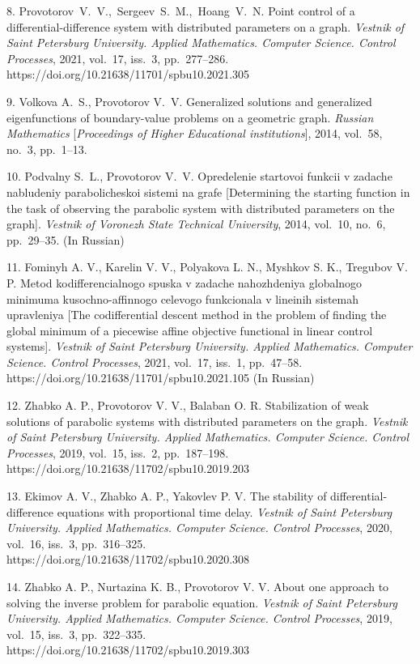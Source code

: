 {8. Provotorov~V.~V.,~Sergeev~S.~M.,~Hoang~V.~N. Point control of a differential-difference system with distributed parameters on a graph. \textit{Vestnik of Saint Petersburg University. Applied Mathematics. Computer Science. Control Processes}, 2021, vol.~17, iss.~3, pp.~277--286. \\
https://doi.org/10.21638/11701/spbu10.2021.305

9. Volkova A.~S., Provotorov V.~V. Generalized solutions and generalized eigenfunctions
of boun\-dary-value problems on a geometric graph. \textit{Russian Mathematics} [\textit{Proceedings of Higher Educational in\-sti\-tu\-tions}], 2014, vol.~58, no.~3, pp.~1--13.

10. Podvalny S.~L., Provotorov V.~V.  Opredelenie startovoi funkcii v zadache nabludeniy parabolicheskoi sistemi na grafe [Determining the starting function in the task of observing the parabolic system with distributed parameters on the graph]. \emph{Vestnik of Voronezh State Technical University}, 2014, vol.~10, no.~6, pp.~29--35. (In Russian)

11. Fominyh A. V., Karelin V. V., Polyakova L. N., Myshkov S. K., Tregubov V. P. Metod kodifferencialnogo spuska v zadache nahozhdeniya globalnogo minimuma kusochno-affinnogo celevogo funkcionala v lineinih sistemah upravleniya [The codifferential descent method in the problem of finding the global minimum of a piecewise affine objective functional in linear control systems]. \emph{Vestnik of Saint Petersburg University. Applied Mathematics. Computer Science. Control Processes}, 2021, vol.~17, iss.~1, pp.~47--58. %
https://doi.org/10.21638/11701/spbu10.2021.105 (In Russian)

12. Zhabko A. P.,  Provotorov V. V., Balaban O. R.  Stabilization of weak solutions of parabolic systems with distributed parameters on the graph. \emph{Vestnik of Saint Petersburg University. Applied Mathematics. Computer Science. Control Processes}, 2019, vol.~15, iss.~2, pp.~187--198. \\
https://doi.org/10.21638/11702/spbu10.2019.203

13. Ekimov A. V., Zhabko A. P., Yakovlev P. V. The stability of differential-difference equations with proportional time delay. \emph{Vestnik of Saint Petersburg University. Applied Mathematics. Computer Science. Control Processes}, 2020, vol.~16, iss.~3, pp.~316--325. \\
https://doi.org/10.21638/11702/spbu10.2020.308

14. Zhabko A. P., Nurtazina K. B., Provotorov V. V. About one approach to
solving the inverse problem for parabolic equation. \emph{Vestnik of Saint Petersburg University.
Applied Mathematics. Computer Science. Control Processes}, 2019, vol.~15, iss.~3, pp.~322--335. \\
https://doi.org/10.21638/11702/spbu10.2019.303

}
